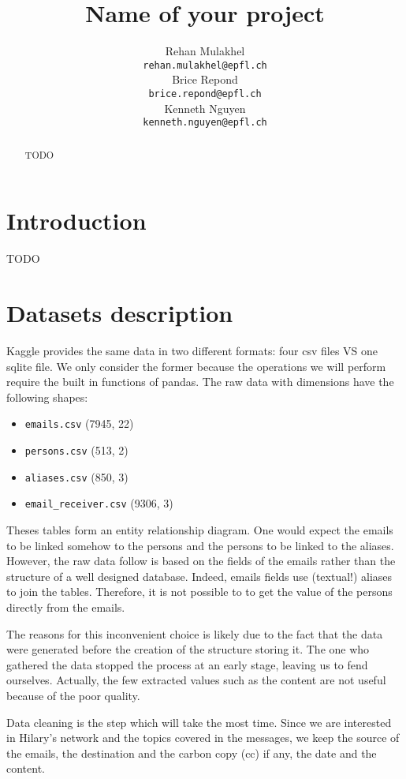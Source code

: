 \documentclass[11pt]{article}
\title{Name of your project}
\author{Rehan Mulakhel \\
  {\tt rehan.mulakhel@epfl.ch} \\\And
  Brice Repond \\
  {\tt brice.repond@epfl.ch} \\\And
  Kenneth Nguyen \\
{\tt kenneth.nguyen@epfl.ch} \\}
\date{}
\begin{document}
\maketitle
\begin{abstract}
TODO
\end{abstract}

\section{Introduction}

TODO

\section{Datasets description}

Kaggle provides the same data in two different formats: four csv files VS one sqlite file. We only consider the former because the operations we will perform require the built in functions of pandas. The raw data with dimensions have the following shapes:

\begin{itemize}
    \item \texttt{emails.csv} (7945, 22)
    \item \texttt{persons.csv} (513, 2)
    \item \texttt{aliases.csv} (850, 3)
    \item \texttt{email\_receiver.csv} (9306, 3)
\end{itemize}

Theses tables form an entity relationship diagram. One would expect the emails to be linked somehow to the persons and the persons to be linked to the aliases. However, the raw data follow is based on the fields of the emails rather than the structure of a well designed database. Indeed, emails fields use (textual!) aliases to join the tables. Therefore, it is not possible to to get the value of the persons directly from the emails.

The reasons for this inconvenient choice is likely due to the fact that the data were generated before the creation of the structure storing it. The one who gathered the data stopped the process at an early stage, leaving us to fend ourselves. Actually, the few extracted values such as the content are not useful because of the poor quality.

Data cleaning is the step which will take the most time. Since we are interested in Hilary's network and the topics covered in the messages, we keep the source of the emails, the destination and the carbon copy (cc) if any, the date and the content.
\end{document}
